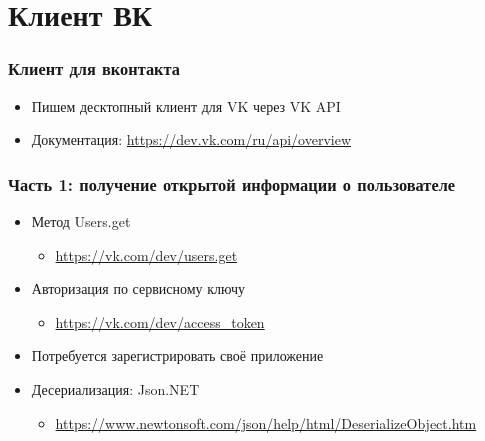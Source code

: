 \documentclass{../../slides-style}
\begin{document}
    \begin{frame}[plain]
        \titlepage
    \end{frame}

    \section{Клиент ВК}

    \begin{frame}
        \frametitle{Клиент для вконтакта}
        \begin{itemize}
            \item Пишем десктопный клиент для VK через VK API
            \item Документация: \url{https://dev.vk.com/ru/api/overview}
        \end{itemize}
    \end{frame}

    \begin{frame}
        \frametitle{Часть 1: получение открытой информации о пользователе}
        \begin{itemize}
            \item Метод Users.get
            \begin{itemize}
                \item \url{https://vk.com/dev/users.get}
            \end{itemize}
            \item Авторизация по сервисному ключу
            \begin{itemize}
                \item \url{https://vk.com/dev/access_token}
            \end{itemize}
            \item Потребуется зарегистрировать своё приложение
            \item Десериализация: Json.NET
            \begin{itemize}
                \item \url{https://www.newtonsoft.com/json/help/html/DeserializeObject.htm}
            \end{itemize}
        \end{itemize}
    \end{frame}
\end{document}
